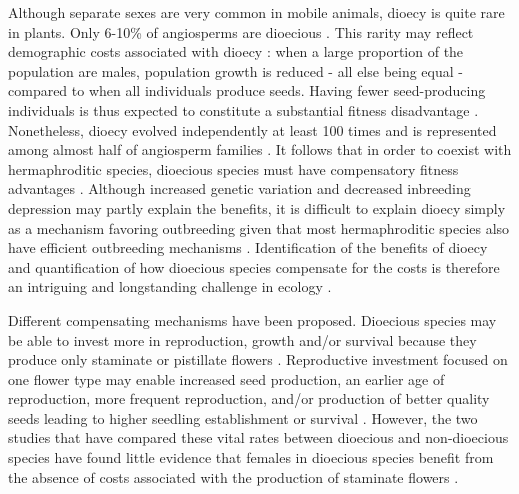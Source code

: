 \documentclass[b5paper,justified]{tufte-book} %
\begin{document}
\begin{fullwidth}
Although separate sexes are very common in mobile animals, dioecy is quite rare in plants. Only 6-10\% of angiosperms are dioecious \citep{Renner1995}. This rarity may reflect demographic costs associated with dioecy \citep{Bawa1980}: when a large proportion of the population are males, population growth is reduced - all else being equal - compared to when all individuals produce seeds. Having fewer seed-producing individuals is thus expected to constitute a substantial fitness disadvantage \citep{Queenborough2007, Vamosi2007, Vamosi2008}. Nonetheless, dioecy evolved independently at least 100 times \citep{Charlesworth2002, Barrett2010} and is represented among almost half of angiosperm families \citep{Renner1995}. It follows that in order to coexist with hermaphroditic species, dioecious species must have compensatory fitness advantages \citep{Bawa1980, Heilbuth2001}. Although increased genetic variation and decreased inbreeding depression may partly explain the benefits, it is difficult to explain dioecy simply as a mechanism favoring outbreeding given that most hermaphroditic species also have efficient outbreeding mechanisms \citep{Bawa1974, Renner1995, Freeman1997}. Identification of the benefits of dioecy and quantification of how dioecious species compensate for the costs is therefore an intriguing and longstanding challenge in ecology \citep[e.g.][]{Darwin1877, Opler1978, Armstrong1989, Renner1995, Freeman1997, Vamosi2008, Queenborough2009}.

Different compensating mechanisms have been proposed. Dioecious species may be able to invest more in reproduction, growth and/or survival because they produce only staminate or pistillate flowers \citep{Bawa1980, Queenborough2007, Queenborough2009, Vamosi2008}. Reproductive investment focused on one flower type may enable increased seed production, an earlier age of reproduction, more frequent reproduction, and/or production of better quality seeds leading to higher seedling establishment or survival \citep{Heilbuth2001, Queenborough2009}. However, the two studies that have compared these vital rates between dioecious and non-dioecious species have found little evidence that females in dioecious species benefit from the absence of costs associated with the production of staminate flowers \citep{Vamosi2008, Queenborough2009}. 


\end{fullwidth}
\end{document}
